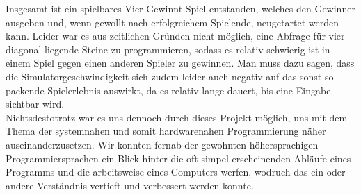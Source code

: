 Insgesamt ist ein spielbares Vier-Gewinnt-Spiel entstanden, welches den Gewinner ausgeben und, wenn gewollt nach erfolgreichem Spielende, neugetartet werden kann.
Leider war es aus zeitlichen Gründen nicht möglich, eine Abfrage für vier diagonal liegende Steine zu programmieren, sodass es relativ schwierig ist in einem Spiel gegen einen anderen Spieler zu gewinnen.
Man muss dazu sagen, dass die Simulatorgeschwindigkeit sich zudem leider auch negativ auf das sonst so packende Spielerlebnis auswirkt, da es relativ lange dauert, bis eine Eingabe sichtbar wird.\\
Nichtsdestotrotz war es uns dennoch durch dieses Projekt möglich, uns mit dem Thema der systemnahen und somit hardwarenahen Programmierung näher auseinanderzusetzen. Wir konnten fernab der gewohnten höhersprachigen Programmiersprachen ein Blick hinter die oft simpel erscheinenden Abläufe eines Programms und die arbeitsweise eines Computers werfen, wodruch das ein oder andere Verständnis vertieft und verbessert werden konnte.


